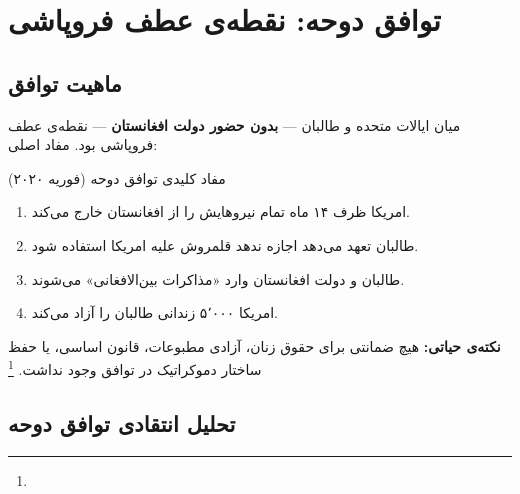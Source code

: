 \section{توافق دوحه: نقطه‌ی عطف فروپاشی}
\label{sec:app-afg-doha}

\subsection{ماهیت توافق}

 میان ایالات متحده و طالبان — \textbf{بدون حضور دولت افغانستان} — نقطه‌ی عطف فروپاشی بود. مفاد اصلی:

\begin{legalNote}{مفاد کلیدی توافق دوحه (فوریه ۲۰۲۰)}
\begin{enumerate}[nosep, label=\textbf{\arabic*.}]
  \item امریکا ظرف ۱۴ ماه تمام نیروهایش را از افغانستان خارج می‌کند.
  \item طالبان تعهد می‌دهد اجازه ندهد قلمروش علیه امریکا استفاده شود.
  \item طالبان و دولت افغانستان وارد «مذاکرات بین‌الافغانی» می‌شوند.
  \item امریکا ۵٬۰۰۰ زندانی طالبان را آزاد می‌کند.
\end{enumerate}
\vspace{4pt}
\textbf{نکته‌ی حیاتی:} هیچ ضمانتی برای حقوق زنان، آزادی مطبوعات، قانون اساسی، یا حفظ ساختار دموکراتیک در توافق وجود نداشت.%
\footnote{}
\end{legalNote}

\subsection{تحلیل انتقادی توافق دوحه}

